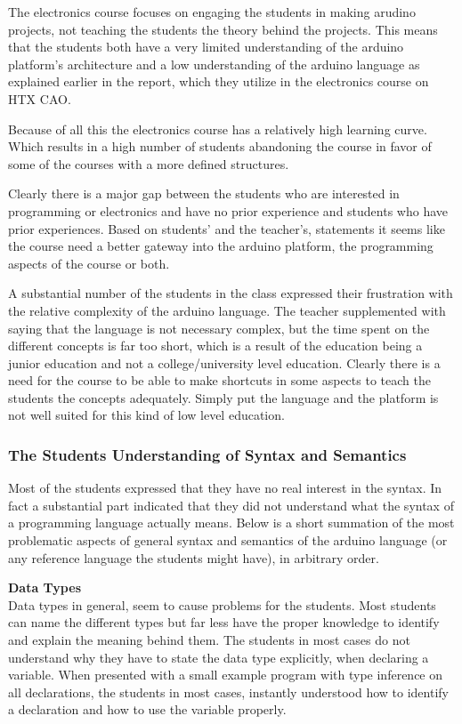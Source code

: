 The electronics course focuses on engaging the students in making arudino projects, not teaching the students the theory behind the projects. This means that the students both have a very limited understanding of the arduino platform's architecture and a low understanding of the arduino language as explained earlier in the report, which they utilize in the electronics course on HTX CAO.

Because of all this the electronics course has a relatively high learning curve. Which results in a high number of students abandoning the course in favor of some of the courses with a more defined structures.

Clearly there is a major gap between the students who are interested in programming or electronics and have no prior experience and students who have prior experiences. 
Based on students' and the teacher's, statements it seems like the course need a better gateway into the arduino platform, the programming aspects of the course or both.

A substantial number of the students in the class expressed their frustration with the relative complexity of the arduino language. The teacher supplemented with saying that the language is not necessary complex, but the time spent on the different concepts is far too short, which is a result of the education being a junior education and not a college/university level education.
Clearly there is a need for the course to be able to make shortcuts in some aspects to teach the students the concepts adequately. Simply put the language and the platform is not well suited for this kind of low level education.

\subsubsection{The Students Understanding of Syntax and Semantics}
Most of the students expressed that they have no real interest in the syntax. In fact a substantial part indicated that they did not understand what the syntax of a programming language actually means. Below is a short summation of the most problematic aspects of general syntax and semantics of the arduino language (or any reference language the students might have), in arbitrary order.

\textbf{Data Types}\\
Data types in general, seem to cause problems for the students. Most students can name the different types but far less have the proper knowledge to identify and explain the meaning behind them. The students in most cases do not understand why they have to state the data type explicitly, when declaring a variable. When presented with a small example program with type inference on all declarations, the students in most cases, instantly understood how to identify a declaration and how to use the variable properly.

